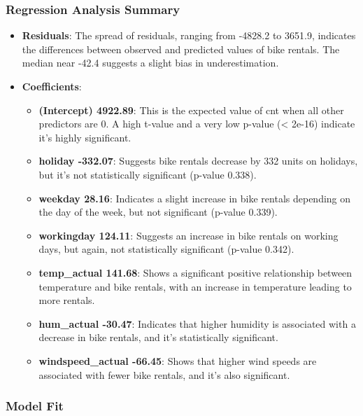 \documentclass[
]{article}
\begin{document}
\subsubsection{\texorpdfstring{\textbf{Regression Analysis
Summary}}{Regression Analysis Summary}}\label{regression-analysis-summary}

\begin{itemize}
\item
  \textbf{Residuals}: The spread of residuals, ranging from -4828.2 to
  3651.9, indicates the differences between observed and predicted
  values of bike rentals. The median near -42.4 suggests a slight bias
  in underestimation.
\item
  \textbf{Coefficients}:

  \begin{itemize}
  \item
    \textbf{(Intercept) 4922.89}: This is the expected value of cnt when
    all other predictors are 0. A high t-value and a very low p-value
    (\textless{} 2e-16) indicate it's highly significant.
  \item
    \textbf{holiday -332.07}: Suggests bike rentals decrease by 332
    units on holidays, but it's not statistically significant (p-value
    0.338).
  \item
    \textbf{weekday 28.16}: Indicates a slight increase in bike rentals
    depending on the day of the week, but not significant (p-value
    0.339).
  \item
    \textbf{workingday 124.11}: Suggests an increase in bike rentals on
    working days, but again, not statistically significant (p-value
    0.342).
  \item
    \textbf{temp\_actual 141.68}: Shows a significant positive
    relationship between temperature and bike rentals, with an increase
    in temperature leading to more rentals.
  \item
    \textbf{hum\_actual -30.47}: Indicates that higher humidity is
    associated with a decrease in bike rentals, and it's statistically
    significant.
  \item
    \textbf{windspeed\_actual -66.45}: Shows that higher wind speeds are
    associated with fewer bike rentals, and it's also significant.
  \end{itemize}
\end{itemize}

\subsubsection{\texorpdfstring{\textbf{Model
Fit}}{Model Fit}}\label{model-fit}
\end{document}
